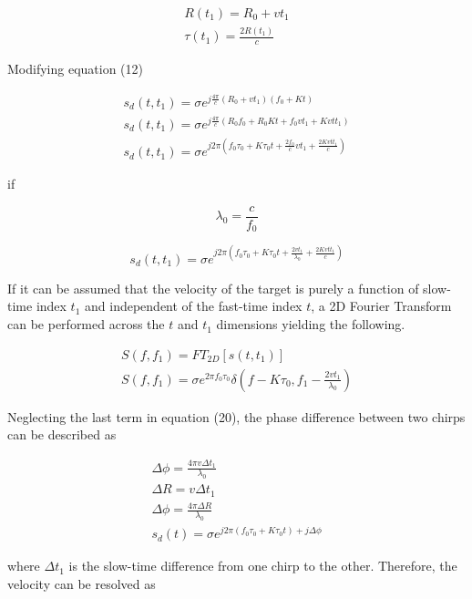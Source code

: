 \documentclass{IEEEtran}
\begin{document}
\begin{align}
    R(t_1) = R_0 + v t_1 \\
    \tau(t_1) = \frac{2R(t_1)}{c}
\end{align}

Modifying equation (12)

\begin{align}
    s_d(t,t_1) = \sigma e^{j\frac{4\pi}{c}(R_0 + v t_1)(f_0 + Kt)} \\
    s_d(t,t_1) = \sigma e^{j\frac{4\pi}{c}(R_0 f_0 + R_0 Kt + f_0 v t_1 + K v t t_1)} \\
    s_d(t,t_1) = \sigma e^{j2\pi (f_0 \tau_0 + K \tau_0 t + \frac{2f_0}{c}v t_1 + \frac{2 K v t t_1}{c})}
\end{align}

if

\begin{equation}
    \lambda_0 = \frac{c}{f_0}
\end{equation}

\begin{equation}
    s_d(t,t_1) = \sigma e^{j2\pi (f_0 \tau_0 + K \tau_0 t + \frac{2v t_1}{\lambda_0} + \frac{2 K v t t_1}{c})}
\end{equation}

If it can be assumed that the velocity of the target is purely a function of  slow-time index $t_1$ and independent of the fast-time index $t$, a 2D Fourier Transform can be performed across the $t$ and $t_1$ dimensions yielding the following.

\begin{align}
	S(f,f_1) = FT_{2D} [s(t,t_1)] \\
	S(f,f_1) = \sigma e^{2\pi f_0 \tau_0} \delta (f - K \tau_0, f_1 - \frac{2v t_1}{\lambda_0})
\end{align}

Neglecting the last term in equation (20), the phase difference between two chirps can be described as

\begin{align}
    \Delta \phi = \frac{4 \pi v \Delta t_1}{\lambda_0} \\
    \Delta R = v \Delta t_1 \\
    \Delta \phi = \frac{4 \pi \Delta R}{\lambda_0} \\
    s_d(t) = \sigma e^{j2\pi (f_0 \tau_0 + K\tau_0 t) + j\Delta \phi}
\end{align}

where $\Delta t_1$ is the slow-time difference from one chirp to the other. Therefore, the velocity can be resolved as
\end{document}
